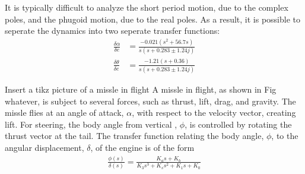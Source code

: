 It is typically difficult to analyze the short period motion, due to the complex poles, and the phugoid motion, due to the real poles. 
As a result, it is possible to seperate the dynamics into two seperate transfer functions:
\begin{align}
    \frac{\delta \alpha}{\delta e} &= \frac{-0.021 (s^2 + 56.7 s)}{s(s+0.283 \pm 1.24 j)} \\
    \frac{\delta \theta}{\delta e} &= \frac{-1.21 (s + 0.36)}{s(s+0.283 \pm 1.24 j)}
\end{align}

\begin{prob}
    Insert a tikz picture of a missle in flight
    A missle in flight, as shown in Fig whatever, is subject to several forces, such as thrust, lift, drag, and gravity. 
    The missle flies at an angle of attack, \( \alpha \), with respect to the velocity vector, creating lift.
    For steering, the body angle from vertical , \( \phi\), is controlled by rotating the thrust vector at the tail.
    The transfer function relating the body angle, \( \phi\), to the angular displacement, \( \delta \), of the engine is of the form
    \begin{align}
        \frac{\phi(s)}{\delta (s)} = \frac{K_a s + K_b}{K_3 s^3 + K_s s^2 + K_1 s + K_0}
    \end{align}
\end{prob}
